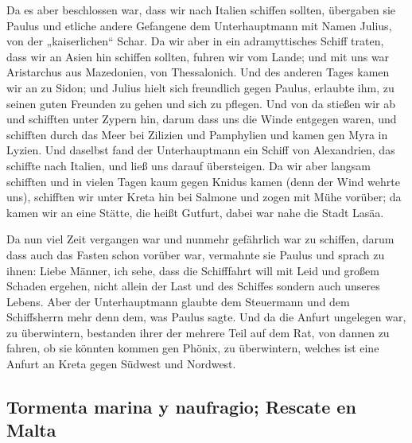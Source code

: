  Da es aber beschlossen war, dass wir nach Italien
schiffen sollten, übergaben sie Paulus und etliche andere Gefangene dem
Unterhauptmann mit Namen Julius, von der „kaiserlichen`` Schar.
 Da wir aber in ein adramyttisches Schiff traten, dass wir
an Asien hin schiffen sollten, fuhren wir vom Lande; und mit uns war
Aristarchus aus Mazedonien, von Thessalonich.  Und des
anderen Tages kamen wir an zu Sidon; und Julius hielt sich freundlich
gegen Paulus, erlaubte ihm, zu seinen guten Freunden zu gehen und sich
zu pflegen.  Und von da stießen wir ab und schifften unter
Zypern hin, darum dass uns die Winde entgegen waren,  und
schifften durch das Meer bei Zilizien und Pamphylien und kamen gen Myra
in Lyzien.  Und daselbst fand der Unterhauptmann ein
Schiff von Alexandrien, das schiffte nach Italien, und ließ uns darauf
übersteigen.  Da wir aber langsam schifften und in vielen
Tagen kaum gegen Knidus kamen (denn der Wind wehrte uns), schifften wir
unter Kreta hin bei Salmone  und zogen mit Mühe vorüber;
da kamen wir an eine Stätte, die heißt Gutfurt, dabei war nahe die Stadt
Lasäa.

 Da nun viel Zeit vergangen war und nunmehr gefährlich war
zu schiffen, darum dass auch das Fasten schon vorüber war, vermahnte sie
Paulus  und sprach zu ihnen: Liebe Männer, ich sehe, dass
die Schifffahrt will mit Leid und großem Schaden ergehen, nicht allein
der Last und des Schiffes sondern auch unseres Lebens. 
Aber der Unterhauptmann glaubte dem Steuermann und dem Schiffsherrn mehr
denn dem, was Paulus sagte.  Und da die Anfurt ungelegen
war, zu überwintern, bestanden ihrer der mehrere Teil auf dem Rat, von
dannen zu fahren, ob sie könnten kommen gen Phönix, zu überwintern,
welches ist eine Anfurt an Kreta gegen Südwest und Nordwest.

\hypertarget{tormenta-marina-y-naufragio-rescate-en-malta}{%
\subsection{Tormenta marina y naufragio; Rescate en
Malta}\label{tormenta-marina-y-naufragio-rescate-en-malta}}

